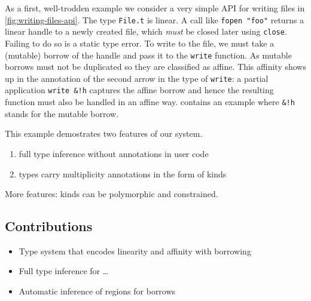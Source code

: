 As a first, well-trodden example we consider a very simple API for
writing files in \cref{fig:writing-files-api}.
The type \lstinline/File.t/ is linear. A call like
\lstinline/fopen "foo"/ returns a linear handle to a newly created
file, which \emph{must} be closed later using
\lstinline/close/. Failing to do so is a static type error.
To write to the file, we must take a (mutable) borrow of the handle and
pass it to the \lstinline/write/
function. As mutable borrows must not be duplicated so they are
classified as affine. This affinity shows up in the annotation of the
second arrow in the type of \lstinline/write/: a partial application
\lstinline/write &!h/ captures the affine borrow and hence the
resulting function must also be handled in an affine way.
 contains an example where
\lstinline/&!h/ stands for the mutable borrow.

This example demostrates two features of our system.
\begin{enumerate}
\item full type inference without annotations in user code
\item types carry multiplicity annotations in the form of kinds
\end{enumerate}

More features: kinds can be polymorphic and constrained. 

\subsection{Contributions}
\label{sec:contributions}

\begin{itemize}
\item Type system that encodes linearity and affinity with borrowing
\item Full type inference for \dots
\item Automatic inference of regions for borrows
\end{itemize}

